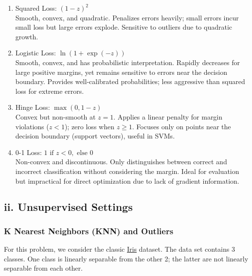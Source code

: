 \documentclass{article}
\begin{document}
\begin{enumerate}
    \item Squared Loss: $(1-z)^2$\\
    Smooth, convex, and quadratic. Penalizes errors heavily; small errors incur small loss but large errors explode. Sensitive to outliers due to quadratic growth.
    \item Logistic Loss: $\ln(1+\exp(-z))$\\
    Smooth, convex, and has probabilistic interpretation. Rapidly decreases for large positive margins, yet remains sensitive to errors near the decision boundary. Provides well-calibrated probabilities; less aggressive than squared loss for extreme errors.
    \item Hinge Loss: $\max(0, 1-z)$\\
    Convex but non-smooth at $z=1$. Applies a linear penalty for margin violations ($z < 1$); zero loss when $z \geq 1$. Focuses only on points near the decision boundary (support vectors), useful in SVMs.
    \item 0-1 Loss: $1 \text{ if } z < 0, \text{ else } 0$\\
    Non-convex and discontinuous. Only distinguishes between correct and incorrect classification without considering the margin. Ideal for evaluation but impractical for direct optimization due to lack of gradient information.
    
\end{enumerate}


\subsection*{ii. Unsupervised Settings}
\subsubsection*{K Nearest Neighbors (KNN) and Outliers}
For this problem, we consider the classic \href{https://archive.ics.uci.edu/dataset/53/iris}{Iris} dataset. The data set contains 3 classes. One class is linearly separable from the other 2; the latter are not linearly separable from each other.\\
\end{document}
